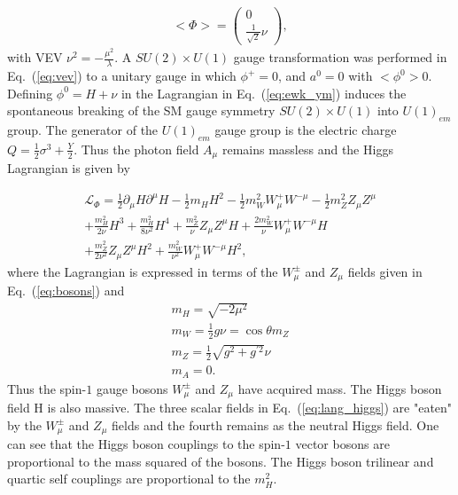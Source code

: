 \begin{eqnarray} \label{eq:vev}
<\Phi>  =  \left(\begin{array}{c} 0\\ \frac{1}{\sqrt{2}}\nu \end{array} \right),
\end{eqnarray}    
with VEV $\nu^2= -\frac{\mu^2}{\lambda}$. A $SU(2)\times U(1)$ gauge transformation was performed in Eq.~(\ref{eq:vev}) to a unitary gauge in which $\phi^{+}=0$, and $a^{0}=0$ with $<\phi^{0}>0$. Defining $\phi^{0}=H+\nu$ in the Lagrangian in Eq.~(\ref{eq:ewk_ym}) induces the spontaneous breaking of the SM gauge symmetry $SU(2)\times U(1)$ into $U(1)_{em}$ group. The generator of the $U(1)_{em}$ gauge group is the electric charge $Q=\frac{1}{2}\sigma^3+\frac{Y}{2}$. Thus the photon field $A_{\mu}$ remains massless and the Higgs Lagrangian is given by

 \begin{eqnarray} \label{eq:ewk_higgs2}
\mathcal{L_{\Phi}} = \frac{1}{2} \partial_{\mu}H\partial^{\mu}H - \frac{1}{2} m_{H} H^2 -\frac{1}{2}m_{W}^2W_{\mu}^{+}W^{-\mu} - \frac{1}{2}m_{Z}^2Z_{\mu}Z^{\mu}  \nonumber \\
+ \frac{m_{H}^2}{2\nu} H^3 + \frac{m_{H}^2}{8\nu^2} H^4 + \frac{m_{Z}^2}{\nu} Z_{\mu}Z^{\mu}H + \frac{2m_{W}^2}{\nu} W^{+}_{\mu}W^{-\mu} H  \nonumber \\
+ \frac{m_{Z}^2}{2\nu^2} Z_{\mu}Z^{\mu} H^2 +\frac{m_{W}^2}{\nu^2} W^{+}_{\mu}W^{-\mu} H^2,
\end{eqnarray}
where the Lagrangian is expressed in terms of the $W_{\mu}^{\pm}$ and $Z_\mu$ fields given in Eq.~(\ref{eq:bosons}) and
 \begin{eqnarray} \label{eq:masses}
m_{H}  = \sqrt{-2\mu^2} \\
m_{W} = \frac{1}{2}g\nu = \cos\theta m_{Z} \\
m_{Z} = \frac{1}{2} \sqrt{g^2+g^{'2}}\nu \\
m_{A} = 0.
\end{eqnarray}
Thus the spin-$1$ gauge bosons $W_{\mu}^{\pm}$ and $Z_\mu$ have acquired mass. The Higgs boson field H is also massive. The three scalar fields in Eq.~(\ref{eq:lang_higgs}) are "eaten" by the $W_{\mu}^{\pm}$ and $Z_\mu$ fields and the fourth remains as the neutral Higgs field. One can see that the Higgs boson couplings to the spin-$1$ vector bosons are proportional to the mass squared of the bosons. The Higgs boson trilinear and quartic self couplings are proportional to the $m_{H}^2$.

